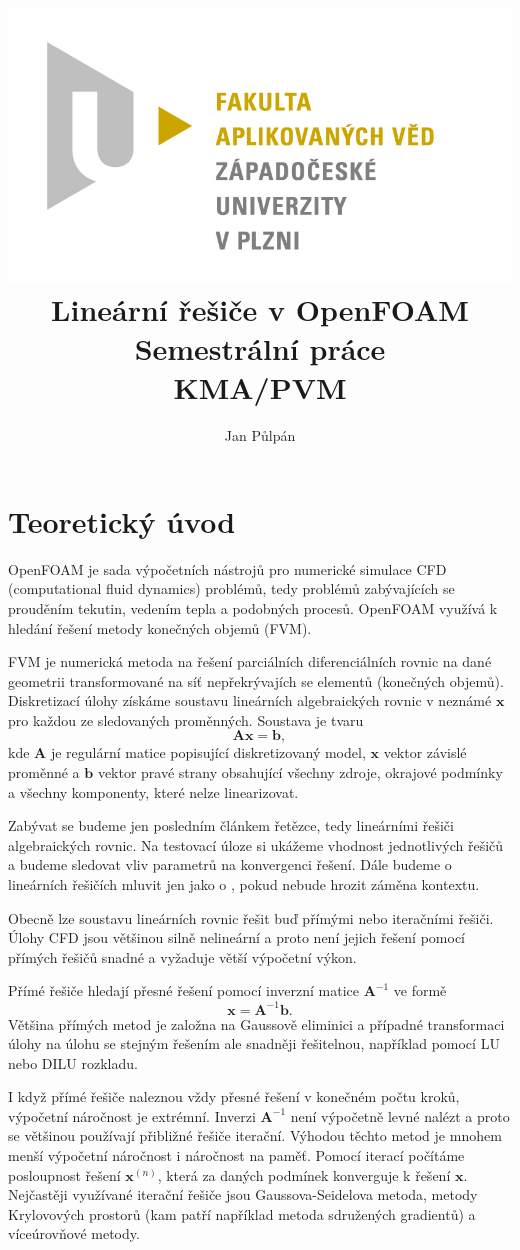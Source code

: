 \documentclass[a4paper,12pt]{report}
\title{
	{\includegraphics[width=\linewidth]{FAV_logo.jpg}}\\[2cm]
	{Lineární řešiče v OpenFOAM}\\	
	{\small{Semestrální práce}}\\
	{\small{KMA/PVM}}\\
}
\author{Jan Půlpán}
\theoremstyle{remark}
\begin{document}
	\maketitle

	{\let\clearpage\relax \chapter{Teoretický úvod}}

	OpenFOAM je sada výpočetních nástrojů pro numerické simulace CFD (computational fluid dynamics) problémů, tedy problémů zabývajících se prouděním tekutin, vedením tepla a podobných procesů. OpenFOAM využívá k hledání řešení metody konečných objemů (FVM). 
	
	FVM je numerická metoda na řešení parciálních diferenciálních rovnic na dané geometrii transformované na síť nepřekrývajích se elementů (konečných objemů). Diskretizací úlohy získáme soustavu lineárních algebraických rovnic v neznámé $\boldsymbol{x}$ pro každou ze sledovaných proměnných. Soustava je tvaru
	\begin{equation}
		\boldsymbol{A}\boldsymbol{x} = \boldsymbol{b},
		\label{eq:linear_set}
	\end{equation}
	kde $\boldsymbol{A}$ je regulární matice popisující diskretizovaný model, $\boldsymbol{x}$ vektor závislé proměnné a $\boldsymbol{b}$ vektor pravé strany obsahující všechny zdroje, okrajové podmínky a všechny komponenty, které nelze linearizovat. 
	
	Zabývat se budeme jen posledním článkem řetězce, tedy lineárními řešiči algebraických rovnic. Na testovací úloze si ukážeme vhodnost jednotlivých řešičů a budeme sledovat vliv parametrů na konvergenci řešení. Dále budeme o lineárních řešičích mluvit jen jako o  , pokud nebude hrozit záměna kontextu.
	
	Obecně lze soustavu lineárních rovnic řešit buď přímými nebo iteračními řešiči. Úlohy CFD jsou většinou silně nelineární a proto není jejich řešení pomocí přímých řešičů snadné a vyžaduje větší výpočetní výkon.
	
	Přímé řešiče hledají přesné řešení pomocí inverzní matice $\boldsymbol{A} ^{-1}$ ve formě
$$ \boldsymbol{x} = \boldsymbol{A}^{-1} \boldsymbol{b}.$$  
Většina přímých metod je založna na Gaussově eliminici a případné transformaci úlohy na úlohu se stejným řešením ale snadněji řešitelnou, například pomocí LU nebo DILU rozkladu.

	I když přímé řešiče naleznou vždy přesné řešení v konečném počtu kroků, výpočetní náročnost je extrémní. Inverzi $\boldsymbol{A} ^{-1}$ není výpočetně levné nalézt a proto se většinou používají přibližné řešiče iterační. Výhodou těchto metod je mnohem menší výpočetní náročnost i náročnost na paměť. Pomocí iterací počítáme posloupnost řešení $\boldsymbol{x}^{(n)}$, která za daných podmínek konverguje k řešení $\boldsymbol{x}$.  Nejčastěji využívané iterační řešiče jsou Gaussova-Seidelova metoda, metody Krylovových prostorů (kam patří například metoda sdružených gradientů) a víceúrovňové metody.
	
\end{document}
